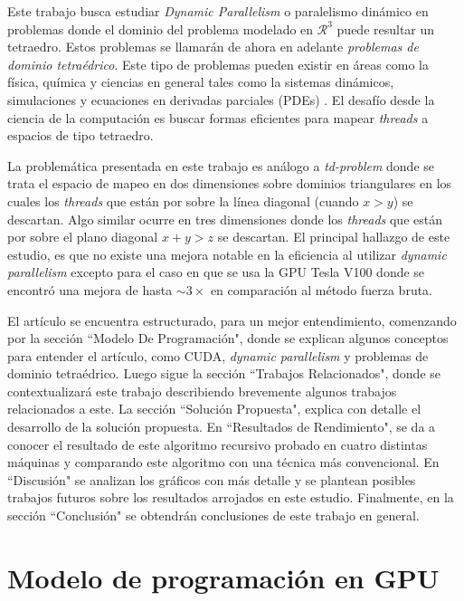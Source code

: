 \documentclass[10pt, conference, compsocconf, onecolumn]{IEEEtran}
\begin{document}
Este trabajo busca estudiar \textit{Dynamic Parallelism} o paralelismo din\'amico en problemas donde el dominio del problema modelado en $\mathcal{R}^3$ puede resultar un tetraedro. Estos problemas se llamar\'an de ahora en adelante \textit{problemas de dominio tetra\'edrico}. Este tipo de problemas pueden existir en \'areas como la f\'isica, qu\'imica y ciencias en general tales como la sistemas din\'amicos, simulaciones y ecuaciones en derivadas parciales (PDEs) \cite{3body2014} \cite{ThreadMapforSimplex2018}. El desaf\'io desde la ciencia de la computaci\'on es buscar formas eficientes para mapear \textit{threads} a espacios de tipo tetraedro.

La problem\'atica presentada en este trabajo es an\'alogo a \textit{td-problem} \cite{TriMap2013} donde se trata el espacio de mapeo en dos dimensiones sobre dominios triangulares en los cuales los \textit{threads} que est\'an por sobre  la l\'inea diagonal (cuando \textit{$x>y$}) se descartan. Algo similar ocurre en tres dimensiones donde los \textit{threads} que est\'an por sobre el plano diagonal $x+y>z$ se descartan. El principal hallazgo de este estudio, es que no existe una mejora notable en la eficiencia al utilizar \textit{dynamic parallelism} excepto para el caso  en que se usa la GPU Tesla V100 donde se encontr\'o una mejora de hasta  $\sim 3\times$ en comparaci\'on al m\'etodo fuerza bruta.

El art\'iculo se encuentra estructurado, para un mejor entendimiento, comenzando por la secci\'on ``Modelo De Programaci\'on", donde se explican algunos conceptos para entender el art\'iculo, como CUDA, \textit{dynamic parallelism} y problemas de dominio tetra\'edrico. Luego sigue la secci\'on ``Trabajos Relacionados", donde se contextualizar\'a este trabajo describiendo brevemente algunos trabajos relacionados a este. La secci\'on ``Soluci\'on Propuesta", explica con detalle el desarrollo de la soluci\'on propuesta. En ``Resultados de Rendimiento", se da a conocer el resultado de este algoritmo recursivo probado en cuatro distintas m\'aquinas y comparando este algoritmo con una t\'ecnica m\'as convencional. En ``Discusi\'on" se analizan los gr\'aficos con m\'as detalle y se plantean posibles trabajos futuros sobre los resultados arrojados en este estudio. Finalmente, en la secci\'on ``Conclusi\'on" se obtendr\'an conclusiones de este trabajo en general.

\section{Modelo de programaci\'on en GPU}
\label{sub_sec_Mod}
\end{document}
